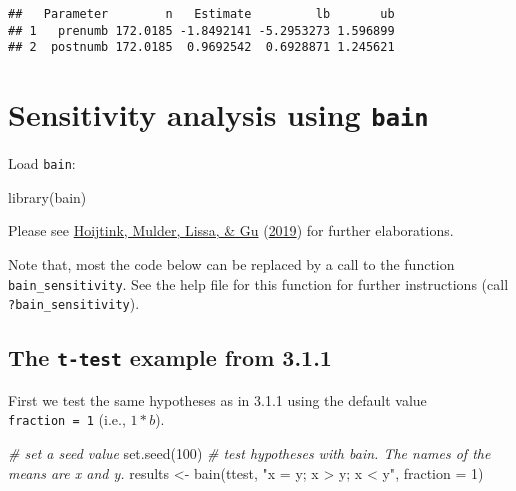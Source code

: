 \documentclass[
]{book}
\newenvironment{Shaded}{\begin{snugshade}}{\end{snugshade}}
\newcommand{\AttributeTok}[1]{\textcolor[rgb]{0.77,0.63,0.00}{#1}}
\newcommand{\CommentTok}[1]{\textcolor[rgb]{0.56,0.35,0.01}{\textit{#1}}}
\newcommand{\DecValTok}[1]{\textcolor[rgb]{0.00,0.00,0.81}{#1}}
\newcommand{\FunctionTok}[1]{\textcolor[rgb]{0.00,0.00,0.00}{#1}}
\newcommand{\NormalTok}[1]{#1}
\newcommand{\OtherTok}[1]{\textcolor[rgb]{0.56,0.35,0.01}{#1}}
\newcommand{\StringTok}[1]{\textcolor[rgb]{0.31,0.60,0.02}{#1}}
\begin{document}
\begin{verbatim}
##   Parameter        n   Estimate         lb       ub
## 1   prenumb 172.0185 -1.8492141 -5.2953273 1.596899
## 2  postnumb 172.0185  0.9692542  0.6928871 1.245621
\end{verbatim}

\hypertarget{sensitivity-analysis-using-bain}{%
\chapter{\texorpdfstring{Sensitivity analysis using \texttt{bain}}{Sensitivity analysis using bain}}\label{sensitivity-analysis-using-bain}}

Load \texttt{bain}:

\begin{Shaded}
\begin{Highlighting}[]
\FunctionTok{library}\NormalTok{(bain)}
\end{Highlighting}
\end{Shaded}

Please see \protect\hyperlink{ref-hoijtink2019tutorial}{Hoijtink, Mulder, Lissa, \& Gu} (\protect\hyperlink{ref-hoijtink2019tutorial}{2019}) for further elaborations.

Note that, most the code below can be replaced by a call to the function \texttt{bain\_sensitivity}. See the help file for this function for further instructions (call \texttt{?bain\_sensitivity}).

\hypertarget{the-t-test-example-from-3.1.1}{%
\section{\texorpdfstring{The \texttt{t-test} example from 3.1.1}{The t-test example from 3.1.1}}\label{the-t-test-example-from-3.1.1}}

First we test the same hypotheses as in 3.1.1 using the default value \texttt{fraction\ =\ 1} (i.e., \(1*b\)).

\begin{Shaded}
\begin{Highlighting}[]
\CommentTok{\# set a seed value}
\FunctionTok{set.seed}\NormalTok{(}\DecValTok{100}\NormalTok{)}
\CommentTok{\# test hypotheses with bain. The names of the means are x and y.}
\NormalTok{results }\OtherTok{\textless{}{-}} \FunctionTok{bain}\NormalTok{(ttest, }\StringTok{"x = y; x \textgreater{} y; x \textless{} y"}\NormalTok{, }\AttributeTok{fraction =} \DecValTok{1}\NormalTok{)}
\end{Highlighting}
\end{Shaded}
\end{document}

